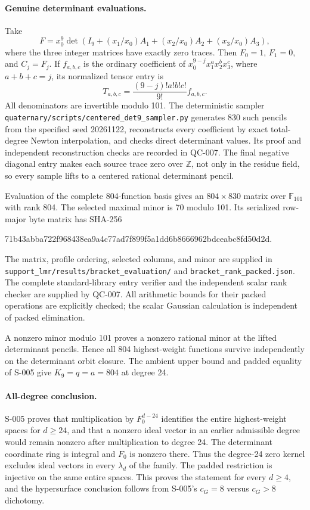 \paragraph{Genuine determinant evaluations.}
Take
\[
     F=x_0^9\det\left(I_9+
              (x_1/x_0)A_1+(x_2/x_0)A_2+(x_3/x_0)A_3\right),
\]
where the three integer matrices have exactly zero traces.  Then
$F_0=1$, $F_1=0$, and $C_j=F_j$.  If $f_{a,b,c}$ is the ordinary
coefficient of $x_0^{9-j}x_1^ax_2^bx_3^c$, where $a+b+c=j$, its
normalized tensor entry is
\[
             T_{a,b,c}=\frac{(9-j)!a!b!c!}{9!}f_{a,b,c}.
\]
All denominators are invertible modulo 101.  The deterministic sampler
\texttt{quaternary/scripts/centered\_det9\_sampler.py} generates 830
such pencils from the specified seed 20261122, reconstructs every
coefficient by exact total-degree Newton interpolation, and checks
direct determinant values.  Its proof and independent reconstruction
checks are recorded in QC-007.  The final negative diagonal entry
makes each source trace zero over $\mathbb Z$, not only in the residue
field, so every sample lifts to a centered rational determinant pencil.

Evaluation of the complete 804-function basis gives an
$804\times830$ matrix over $\mathbb F_{101}$ with rank 804.
The selected maximal minor is 70 modulo 101.  Its serialized row-major
byte matrix has SHA-256
\begin{center}\small\ttfamily
71b43abba722f968438ea9a4c77ad7f899f5a1dd6b8666962bdceabc8fd50d2d.
\end{center}
The matrix, profile ordering, selected columns, and minor are supplied
in \texttt{support\_lmr/results/bracket\_evaluation/} and
\texttt{bracket\_rank\_packed.json}.  The complete standard-library
entry verifier and the independent scalar rank checker are supplied
by QC-007.  All arithmetic bounds for their packed operations are
explicitly checked; the scalar Gaussian calculation is independent
of packed elimination.

A nonzero minor modulo 101 proves a nonzero rational minor at the
lifted determinant pencils.  Hence all 804 highest-weight functions
survive independently on the determinant orbit closure.  The ambient
upper bound and padded equality of S-005 give
$K_9=q=a=804$ at degree 24.

\paragraph{All-degree conclusion.}
S-005 proves that multiplication by $F_0^{d-24}$ identifies the entire
highest-weight spaces for $d\geq24$, and that a nonzero ideal vector
in an earlier admissible degree would remain nonzero after multiplication
to degree 24.  The determinant coordinate ring is integral and $F_0$
is nonzero there.  Thus the degree-24 zero kernel excludes ideal vectors
in every $\lambda_d$ of the family.  The padded restriction is injective
on the same entire spaces.  This proves the statement for every
$d\geq4$, and the hypersurface conclusion follows from S-005's
$c_G=8$ versus $c_G>8$ dichotomy.

